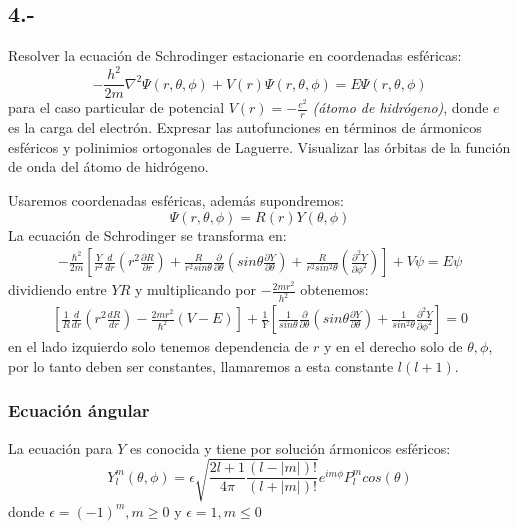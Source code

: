 \documentclass{article}
\begin{document}
\subsection*{4.-}
Resolver la ecuación de Schrodinger estacionarie en coordenadas esféricas:
\[ -\frac{h^2}{2m} \nabla^2 \Psi (r,\theta,\phi) + V(r)\Psi(r,\theta,\phi) = E\Psi(r,\theta,\phi) \]
para el caso particular de potencial $V(r)=-\frac{e^2}{r}$ \textit{(átomo de hidrógeno)}, donde $e$ es la carga del electrón. 
Expresar las autofunciones en términos de ármonicos esféricos y polinimios ortogonales de Laguerre. Visualizar las órbitas de la función de onda del átomo de hidrógeno.
\begin{tcolorbox}[breakable]
    Usaremos coordenadas esféricas, además supondremos:
    \[ \Psi(r,\theta,\phi) = R(r)Y(\theta,\phi) \]
    La ecuación de Schrodinger se transforma en:
    \begin{align*}
    -\frac{\hbar^2}{2m}\left[
    \frac{Y}{r^2}\frac{d }{d r} \left( r^2\frac{\partial R}{\partial r} \right)    
    +\frac{R}{r^2sin\theta} \frac{\partial }{\partial \theta} \left( sin\theta \frac{\partial Y}{\partial \theta} \right)
    +\frac{R}{r^2sin^2\theta} \left(\frac{\partial^2 Y}{\partial \phi^2}\right)
    \right] + V\psi = E\psi 
    \end{align*}
    dividiendo entre $YR$ y multiplicando por $-\frac{2mr^2}{h^2}$ obtenemos:
    \begin{align*}
        \left[\frac{1}{R}\frac{d}{dr}\left( r^2\frac{dR}{dr} \right) - \frac{2mr^2}{\hbar^2}(V-E) \right]
        +\frac{1}{Y}\left[ \frac{1}{sin\theta}\frac{\partial }{\partial \theta} \left( sin\theta \frac{\partial Y}{\partial \theta} \right) + \frac{1}{sin^2\theta}\frac{\partial^2 Y}{\partial \phi^2}  \right]
        = 0
    \end{align*}
    en el lado izquierdo solo tenemos dependencia de $r$ y en el derecho solo de $\theta,\phi$, por lo tanto 
    deben ser constantes, llamaremos a esta constante $l(l+1)$. \\ 
    \subsubsection*{Ecuación ángular}
    La ecuación	para $Y$ es conocida y tiene por solución ármonicos esféricos:
    \[ Y_l^m(\theta, \phi) = \epsilon 
    \sqrt{\frac{2l+1}{4\pi} \frac{(l-|m|)!}{(l+|m|)!}}
    e^{im\phi}P_l^mcos(\theta) \]
    donde $\epsilon = (-1)^m, m\geq 0$ y $\epsilon = 1, m \leq 0$
    

\end{tcolorbox}
\end{document}
